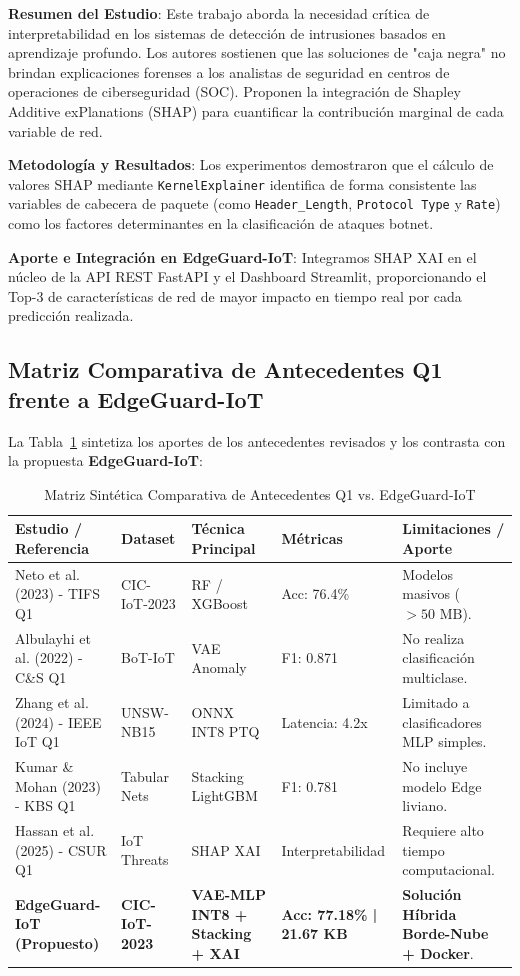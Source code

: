 \textbf{Resumen del Estudio}:
Este trabajo aborda la necesidad crítica de interpretabilidad en los sistemas de detección de intrusiones basados en aprendizaje profundo. Los autores sostienen que las soluciones de "caja negra" no brindan explicaciones forenses a los analistas de seguridad en centros de operaciones de ciberseguridad (SOC). Proponen la integración de Shapley Additive exPlanations (SHAP) para cuantificar la contribución marginal de cada variable de red.

\textbf{Metodología y Resultados}:
Los experimentos demostraron que el cálculo de valores SHAP mediante \texttt{KernelExplainer} identifica de forma consistente las variables de cabecera de paquete (como \texttt{Header\_Length}, \texttt{Protocol Type} y \texttt{Rate}) como los factores determinantes en la clasificación de ataques botnet.

\textbf{Aporte e Integración en EdgeGuard-IoT}:
Integramos SHAP XAI en el núcleo de la API REST FastAPI y el Dashboard Streamlit, proporcionando el Top-3 de características de red de mayor impacto en tiempo real por cada predicción realizada.

\subsection{Matriz Comparativa de Antecedentes Q1 frente a EdgeGuard-IoT}
La Tabla~\ref{tab:matriz_antecedentes} sintetiza los aportes de los antecedentes revisados y los contrasta con la propuesta \textbf{EdgeGuard-IoT}:

\begin{table}[H]
\centering
\caption{Matriz Sintética Comparativa de Antecedentes Q1 vs. EdgeGuard-IoT}
\label{tab:matriz_antecedentes}
\scriptsize
\begin{tabular}{p{2.8cm} p{2.2cm} p{2.5cm} p{2.5cm} p{3.2cm}}
\toprule
\textbf{Estudio / Referencia} & \textbf{Dataset} & \textbf{Técnica Principal} & \textbf{Métricas} & \textbf{Limitaciones / Aporte} \\
\midrule
Neto et al. (2023) - TIFS Q1 & CIC-IoT-2023 & RF / XGBoost & Acc: 76.4\% & Modelos masivos ($>50\text{ MB}$). \\
Albulayhi et al. (2022) - C\&S Q1 & BoT-IoT & VAE Anomaly & F1: 0.871 & No realiza clasificación multiclase. \\
Zhang et al. (2024) - IEEE IoT Q1 & UNSW-NB15 & ONNX INT8 PTQ & Latencia: 4.2x & Limitado a clasificadores MLP simples. \\
Kumar \& Mohan (2023) - KBS Q1 & Tabular Nets & Stacking LightGBM & F1: 0.781 & No incluye modelo Edge liviano. \\
Hassan et al. (2025) - CSUR Q1 & IoT Threats & SHAP XAI & Interpretabilidad & Requiere alto tiempo computacional. \\
\textbf{EdgeGuard-IoT (Propuesto)} & \textbf{CIC-IoT-2023} & \textbf{VAE-MLP INT8 + Stacking + XAI} & \textbf{Acc: 77.18\% | 21.67 KB} & \textbf{Solución Híbrida Borde-Nube + Docker}. \\
\bottomrule
\end{tabular}
\end{table}
